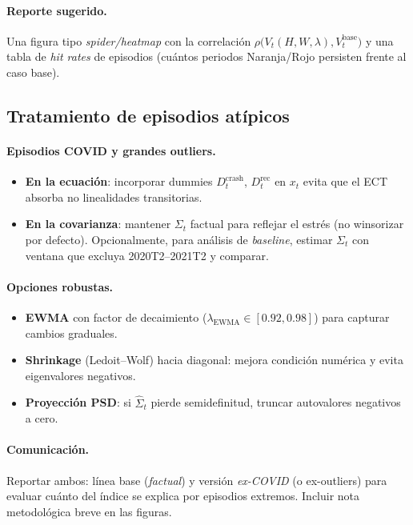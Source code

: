 \documentclass[11pt,a4paper]{article}
\newcommand{\1}{\mathbf{1}}
\begin{document}
\paragraph{Reporte sugerido.}
Una figura tipo \emph{spider/heatmap} con la correlación \(\rho\big(V_t(H,W,\lambda), V_t^{\text{base}}\big)\) y una tabla de \emph{hit rates} de episodios (cuántos periodos Naranja/Rojo persisten frente al caso base).

\subsection{Tratamiento de episodios atípicos}

\paragraph{Episodios COVID y grandes outliers.}
\begin{itemize}
  \item \textbf{En la ecuación}: incorporar dummies $D^{\text{crash}}_t$, $D^{\text{rec}}_t$ en $x_t$ evita que el ECT absorba no linealidades transitorias.
  \item \textbf{En la covarianza}: mantener $\Sigma_t$ factual para reflejar el estrés (no winsorizar por defecto). 
  Opcionalmente, para análisis de \emph{baseline}, estimar $\Sigma_t$ con ventana que excluya 2020T2--2021T2 y comparar.
\end{itemize}

\paragraph{Opciones robustas.}
\begin{itemize}
  \item \textbf{EWMA} con factor de decaimiento ($\lambda_{\text{EWMA}}\in[0.92,0.98]$) para capturar cambios graduales.
  \item \textbf{Shrinkage} (Ledoit--Wolf) hacia diagonal: mejora condición numérica y evita eigenvalores negativos.
  \item \textbf{Proyección PSD}: si $\widehat{\Sigma}_t$ pierde semidefinitud, truncar autovalores negativos a cero.
\end{itemize}

\paragraph{Comunicación.}
Reportar ambos: línea base (\emph{factual}) y versión \emph{ex-COVID} (o ex-outliers) para evaluar cuánto del índice se explica por episodios extremos. 
Incluir nota metodológica breve en las figuras.
\end{document}
